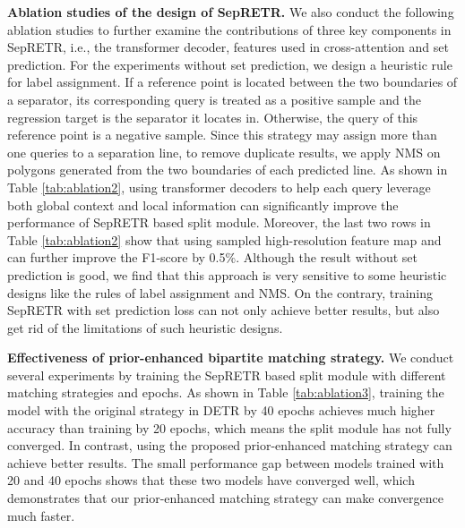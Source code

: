 \documentclass[sigconf]{acmart}
\begin{document}
\textbf{Ablation studies of the design of SepRETR.} We also conduct the following ablation studies to further examine the contributions of three key components in SepRETR, i.e., the transformer decoder, features used in cross-attention and set prediction. For the experiments without set prediction, we design a heuristic rule for label assignment. If a reference point is located between the two boundaries of a separator, its corresponding query is treated as a positive sample and the regression target is the separator it locates in. Otherwise, the query of this reference point is a negative sample. Since this strategy may assign more than one queries to a separation line, to remove duplicate results, we apply NMS on polygons generated from the two boundaries of each predicted line. As shown in Table \ref{tab:ablation2}, using transformer decoders to help each query leverage both global context and local information can significantly improve the performance of SepRETR based split module. Moreover, the last two rows in Table \ref{tab:ablation2} show that using sampled high-resolution feature map  and  can further improve the F1-score by 0.5\%. Although the result without set prediction is good, we find that this approach is very sensitive to some heuristic designs like the rules of label assignment and NMS. On the contrary, training SepRETR with set prediction loss can not only achieve better results, but also get rid of the limitations of such heuristic designs.

\textbf{Effectiveness of prior-enhanced bipartite matching strategy.} We conduct several experiments by training the SepRETR based split module with different matching strategies and epochs. As shown in Table \ref{tab:ablation3}, training the model with the original strategy in DETR by 40 epochs achieves much higher accuracy than training by 20 epochs, which means the split module has not fully converged. In contrast, using the proposed prior-enhanced matching strategy can achieve better results. The small performance gap between models trained with 20 and 40 epochs shows that these two models have converged well, which demonstrates that our prior-enhanced matching strategy can make convergence much faster.
\end{document}
